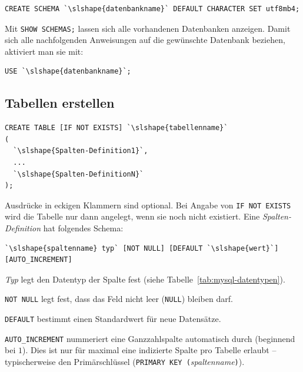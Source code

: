 \begin{lstlisting}
CREATE SCHEMA `\slshape{datenbankname}` DEFAULT CHARACTER SET utf8mb4;
\end{lstlisting}

Mit \lstinline|SHOW SCHEMAS;| lassen sich alle vorhandenen Datenbanken
anzeigen. Damit sich alle nachfolgenden Anweisungen auf die gewünschte
Datenbank beziehen, aktiviert man sie mit:

\begin{lstlisting}
USE `\slshape{datenbankname}`;
\end{lstlisting}


\subsection{Tabellen erstellen}

\begin{lstlisting}
CREATE TABLE [IF NOT EXISTS] `\slshape{tabellenname}`
(
  `\slshape{Spalten-Definition1}`,
  ...  
  `\slshape{Spalten-DefinitionN}`
);
\end{lstlisting}

Ausdrücke in eckigen Klammern sind optional. Bei Angabe von
\lstinline|IF NOT EXISTS| wird die Tabelle nur dann angelegt, wenn sie noch
nicht existiert. Eine \textit{Spalten-Definition} hat folgendes Schema:

\begin{lstlisting}
`\slshape{spaltenname} typ` [NOT NULL] [DEFAULT `\slshape{wert}`] [AUTO_INCREMENT]
\end{lstlisting}

\begin{compactitem}
  \item \textit{Typ} legt den Datentyp der Spalte fest (siehe
  Tabelle~\ref{tab:mysql-datentypen}).
  \item \lstinline|NOT NULL| legt fest, dass das Feld nicht leer
  (\lstinline|NULL|) bleiben darf.
  \item \lstinline|DEFAULT| bestimmt einen Standardwert für neue Datensätze.
  \item \lstinline|AUTO_INCREMENT| nummeriert eine Ganzzahlspalte automatisch
  durch (beginnend bei $1$). Dies ist nur für maximal eine indizierte Spalte
  pro Tabelle erlaubt -- typischerweise den Primärschlüssel \linebreak
  (\lstinline|PRIMARY KEY (|\textit{spaltenname}\lstinline|)|).
\end{compactitem}

